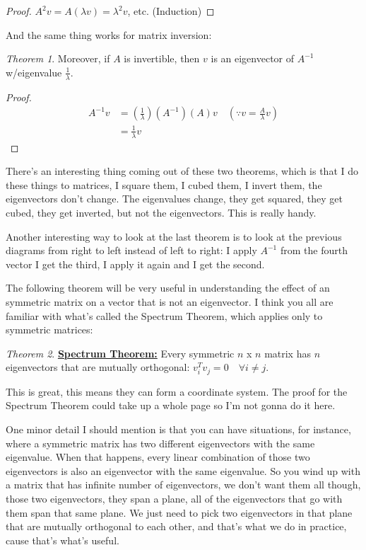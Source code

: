 \documentclass[fleqn,10pt]{olplainarticle}
\theoremstyle{definition}
\theoremstyle{remark}
\newtheorem{theorem}{Theorem}
\begin{document}
\begin{proof}
$A^2v = A(\lambda v) = \lambda^2v$, etc. (Induction)
\end{proof}

And the same thing works for matrix inversion:\medskip

\begin{theorem}
Moreover, if $A$ is invertible, then $v$ is an eigenvector of $A^{-1}$ w/eigenvalue $\frac{1}{\lambda}$.
\end{theorem}

\begin{proof}
$$
\begin{aligned}
A^{-1}v
& = (\frac{1}{\lambda})(A^{-1})(A)v \quad (\because v = \frac{A}{\lambda}v) \\
& = \frac{1}{\lambda}v
\end{aligned}
$$
\end{proof}

There's an interesting thing coming out of these two theorems, which is that I do these things to matrices, I square them, I cubed them, I invert them, the eigenvectors don't change. The eigenvalues change, they get squared, they get cubed, they get inverted, but not the eigenvectors. This is really handy.

Another interesting way to look at the last theorem is to look at the previous diagrams from right to left instead of left to right: I apply $A^{-1}$ from the fourth vector I get the third, I apply it again and I get the second.

The following theorem will be very useful in understanding the effect of an symmetric matrix on a vector that is not an eigenvector. I think you all are familiar with what's called the Spectrum Theorem, which applies only to symmetric matrices:\medskip

\begin{theorem}
\textbf\underline{{Spectrum Theorem:}} Every symmetric $n$ x $n$ matrix has $n$ eigenvectors that are mutually orthogonal: $v_i^T v_j = 0 \quad \forall i \neq j$.
\end{theorem}

This is great, this means they can form a coordinate system. The proof for the Spectrum Theorem could take up a whole page so I'm not gonna do it here. 

One minor detail I should mention is that you can have situations, for instance, where a symmetric matrix has two different eigenvectors with the same eigenvalue. When that happens, every linear combination of those two eigenvectors is also an eigenvector with the same eigenvalue. So you wind up with a matrix that has infinite number of eigenvectors, we don't want them all though, those two eigenvectors, they span a plane, all of the eigenvectors that go with them span that same plane. We just need to pick two eigenvectors in that plane that are mutually orthogonal to each other, and that's what we do in practice, cause that's what's useful.
\end{document}
